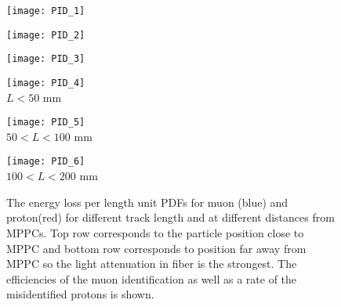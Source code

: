 \documentclass[main.tex]{subfiles}
\begin{document}
\begin{figure}[!ht]
	\centering
	\begin{minipage}{0.25\linewidth}
		\centering
		\texttt{[image: PID\_1]}
	\end{minipage}
	\begin{minipage}{0.25\linewidth}
		\centering
		\texttt{[image: PID\_2]}
	\end{minipage}
	\begin{minipage}{0.25\linewidth}
		\centering
		\texttt{[image: PID\_3]}
	\end{minipage}
	\hfill
	\begin{minipage}{0.25\linewidth}
		\centering
		\texttt{[image: PID\_4]} \\ $ L < 50$ mm
	\end{minipage}
	\begin{minipage}{0.25\linewidth}
		\centering
		\texttt{[image: PID\_5]} \\ $50 < L < 100$ mm
	\end{minipage}
	\begin{minipage}{0.25\linewidth}
		\centering
		\texttt{[image: PID\_6]} \\  $100 < L < 200$ mm
	\end{minipage}
	\caption{The energy loss per length unit PDFs for muon (blue) and proton(red) for different track length and at different distances from MPPCs. Top row corresponds to the particle position close to MPPC and bottom row corresponds to position far away from MPPC so the light attenuation in fiber is the strongest. The efficiencies of the muon identification as well as a rate of the misidentified protons is shown.}
	\label{fig:up:sfgd:pid}
\end{figure}
\end{document}
